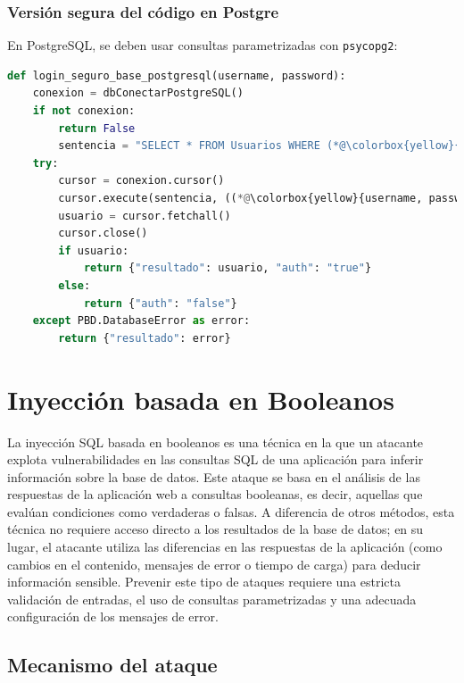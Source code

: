 \documentclass[a4paper,12pt]{article}
\begin{document}
\subsubsection{Versión segura del código en Postgre}
En PostgreSQL, se deben usar consultas parametrizadas con \texttt{psycopg2}:

\begin{lstlisting}[language=Python]
def login_seguro_base_postgresql(username, password):
    conexion = dbConectarPostgreSQL()
    if not conexion:
        return False
        sentencia = "SELECT * FROM Usuarios WHERE (*@\colorbox{yellow}{username = \%s AND password = \%s}@*)"
    try:
        cursor = conexion.cursor()
        cursor.execute(sentencia, ((*@\colorbox{yellow}{username, password}@*)))
        usuario = cursor.fetchall()
        cursor.close()
        if usuario:
            return {"resultado": usuario, "auth": "true"}
        else:
            return {"auth": "false"}
    except PBD.DatabaseError as error:
        return {"resultado": error}
\end{lstlisting}

\section{Inyección basada en Booleanos}

La inyección SQL basada en booleanos es una técnica en la que un atacante explota vulnerabilidades en las consultas SQL de una aplicación para inferir información sobre la base de datos. Este ataque se basa en el análisis de las respuestas de la aplicación web a consultas booleanas, es decir, aquellas que evalúan condiciones como verdaderas o falsas. A diferencia de otros métodos, esta técnica no requiere acceso directo a los resultados de la base de datos; en su lugar, el atacante utiliza las diferencias en las respuestas de la aplicación (como cambios en el contenido, mensajes de error o tiempo de carga) para deducir información sensible. Prevenir este tipo de ataques requiere una estricta validación de entradas, el uso de consultas parametrizadas y una adecuada configuración de los mensajes de error.

\subsection{Mecanismo del ataque}
\end{document}
